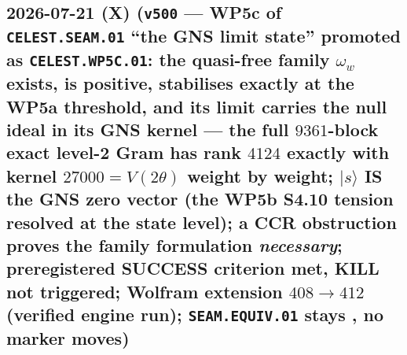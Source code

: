 \subsection*{2026-07-21 (X) (\texttt{v500} --- WP5c of \texttt{CELEST.SEAM.01} ``the GNS limit state'' promoted as \texttt{CELEST.WP5C.01}: the quasi-free family $\omega_w$ exists, is positive, stabilises exactly at the WP5a threshold, and its limit carries the null ideal in its GNS kernel --- the full $9361$-block exact level-2 Gram has rank $4124$ exactly with kernel $27000=V(2\theta)$ weight by weight; $|s\rangle$ IS the GNS zero vector (the WP5b S4.10 tension resolved at the state level); a CCR obstruction proves the family formulation \emph{necessary}; preregistered SUCCESS criterion met, KILL not triggered; Wolfram extension $408\to412$ (verified engine run); \texttt{SEAM.EQUIV.01} stays \mO, no marker moves)}

